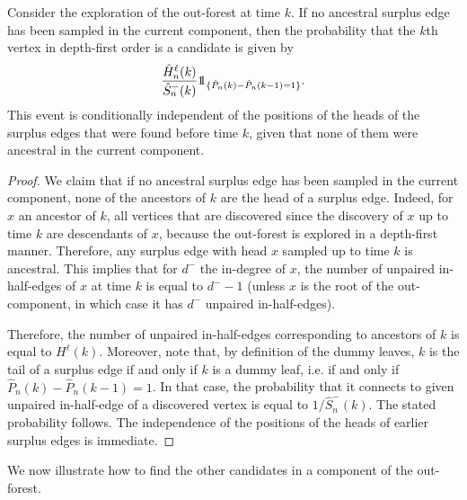 \begin{proposition}\label{prop:probancestral}
Consider the exploration of the out-forest at time $k$. If no ancestral surplus edge has been sampled in the current component, then the probability that the $k$th vertex in depth-first order is a candidate is given by 
$$\frac{\hat{H}^\ell_n(k)}{\hat{S}_n^-(k)}\one_{\{\hat{P}_n(k)-\hat{P}_n(k-1)=1\}}.$$
This event is conditionally independent of the positions of the heads of the surplus edges that were found before time $k$, given that none of them were ancestral in the current component.
\end{proposition}
\begin{proof}
We claim that if no ancestral surplus edge has been sampled in the current component, none of the ancestors of $k$ are the head of a surplus edge. Indeed, for $x$ an ancestor of $k$, all vertices that are discovered since the discovery of $x$ up to time $k$ are descendants of $x$, because the out-forest is explored in a depth-first manner. Therefore, any surplus edge with head $x$ sampled up to time $k$ is ancestral. This implies that for $d^-$ the in-degree of $x$, the number of unpaired in-half-edges of $x$ at time $k$ is equal to $d^--1$ (unless $x$ is the root of the out-component, in which case it has $d^-$ unpaired in-half-edges).

Therefore, the number of unpaired in-half-edges corresponding to ancestors of $k$ is equal to $H^\ell(k)$. Moreover, note that, by definition of the dummy leaves, $k$ is the tail of a surplus edge if and only if $k$ is a dummy leaf, i.e. if and only if $\hat{P}_n(k)-\hat{P}_n(k-1)=1$. In that case, the probability that it connects to given unpaired in-half-edge of a discovered vertex is equal to $1/\hat{S}_n^-(k)$. The stated probability follows. The independence of the positions of the heads of earlier surplus edges is immediate.
\end{proof}

We now illustrate how to find the other candidates in a component of the out-forest. 

